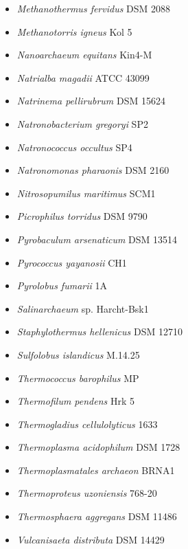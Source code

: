 \begin{itemize}
    \item \textit{Methanothermus fervidus} DSM 2088
    \item \textit{Methanotorris igneus} Kol 5
    \item \textit{Nanoarchaeum equitans} Kin4-M
    \item \textit{Natrialba magadii} ATCC 43099
    \item \textit{Natrinema pellirubrum} DSM 15624
    \item \textit{Natronobacterium gregoryi} SP2
    \item \textit{Natronococcus occultus} SP4
    \item \textit{Natronomonas pharaonis} DSM 2160
    \item \textit{Nitrosopumilus maritimus} SCM1
    \item \textit{Picrophilus torridus} DSM 9790
    \item \textit{Pyrobaculum arsenaticum} DSM 13514
    \item \textit{Pyrococcus yayanosii} CH1
    \item \textit{Pyrolobus fumarii} 1A
    \item \textit{Salinarchaeum} sp. Harcht-Bsk1
    \item \textit{Staphylothermus hellenicus} DSM 12710
    \item \textit{Sulfolobus islandicus} M.14.25
    \item \textit{Thermococcus barophilus} MP
    \item \textit{Thermofilum pendens} Hrk 5
    \item \textit{Thermogladius cellulolyticus} 1633
    \item \textit{Thermoplasma acidophilum} DSM 1728
    \item \textit{Thermoplasmatales archaeon} BRNA1
    \item \textit{Thermoproteus uzoniensis} 768-20
    \item \textit{Thermosphaera aggregans} DSM 11486
    \item \textit{Vulcanisaeta distributa} DSM 14429
\end{itemize}


